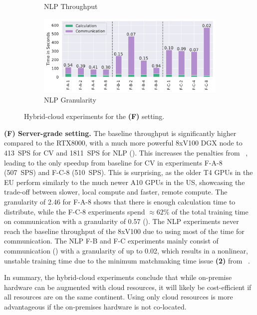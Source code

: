 \begin{figure}
\begin{subfigure}[c]{0.24\textwidth}
        \vspace{-15pt} 
        \caption{NLP Throughput}
        \label{fig:nlp-research-hybrid-cloud-throughput}
    \end{subfigure}
    \begin{subfigure}[c]{0.21\textwidth}
        \includegraphics[width=\textwidth]{figures/misc/nlp-research-cloud-performance-granularity}  
        \caption{NLP Granularity} 
        \label{fig:nlp-research-hybrid-cloud-granularity}
    \end{subfigure}
    \vspace{-10pt}
    \caption{Hybrid-cloud experiments for the \textbf{(F)} setting.}
    \label{fig:research-hybrid-cloud-performance}
    \vspace*{-5mm}
\end{figure} 

\textbf{(F) Server-grade setting.} The baseline throughput is significantly higher compared to the RTX8000, with a much more powerful 8xV100 DGX node to 413~SPS for CV and 1811~SPS for NLP ().
This increases the penalties from ~, leading to the only speedup from baseline for CV in experiments F-A-8 (507~SPS) and F-C-8 (510~SPS).
This is surprising, as the older T4 GPUs in the EU perform similarly to the much newer A10 GPUs in the US, showcasing the trade-off between slower, local compute and faster, remote compute.
The granularity of 2.46 for F-A-8 shows that there is enough calculation time to distribute, while the F-C-8 experiments spend $\approx 62\%$ of the total training time on communication with a granularity of 0.57 ().
The NLP experiments never reach the baseline throughput of the 8xV100 due to using most of the time for communication. 
The NLP F-B and F-C experiments mainly consist of communication () with a granularity of up to 0.02, which results in a nonlinear, unstable training time due to the minimum matchmaking time issue \textbf{(2)} from ~.

In summary, the hybrid-cloud experiments conclude that while on-premise hardware can be augmented with cloud resources, it will likely be cost-efficient if all resources are on the same continent.
Using only cloud resources is more advantageous if the on-premises hardware is not co-located.